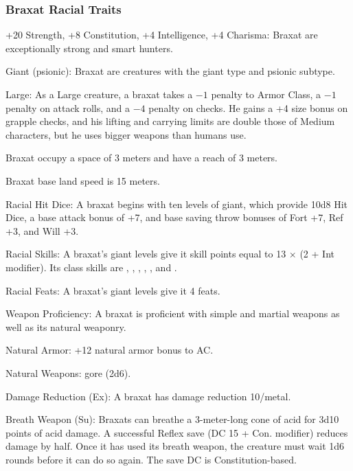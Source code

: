 \subsubsection{Braxat Racial Traits}
\begin{itemize*}
	\item +20 Strength, +8 Constitution, +4 Intelligence, +4 Charisma: Braxat are exceptionally strong and smart hunters.
    \item Giant (psionic): Braxat are creatures with the giant type and psionic subtype.
	\item Large: As a Large creature, a braxat takes a $-1$ penalty to Armor Class, a $-1$ penalty on attack rolls, and a $-4$ penalty on  checks. He gains a +4 size bonus on grapple checks, and his lifting and carrying limits are double those of Medium characters, but he uses bigger weapons than humans use.
    \item Braxat occupy a space of 3 meters and have a reach of 3 meters.
    \item Braxat base land speed is 15 meters.

    \item Racial Hit Dice: A braxat begins with ten levels of giant, which provide 10d8 Hit Dice, a base attack bonus of +7, and base saving throw bonuses of Fort +7, Ref +3, and Will +3.
    \item Racial Skills: A braxat's giant levels give it skill points equal to 13 $\times$ (2 + Int modifier). Its class skills are , , , , , and .
    \item Racial Feats: A braxat's giant levels give it 4 feats.
    \item Weapon Proficiency: A braxat is proficient with simple and martial weapons as well as its natural weaponry.

    \item Natural Armor: +12 natural armor bonus to AC.
    \item Natural Weapons: gore (2d6).

    \item Damage Reduction (Ex): A braxat has damage reduction 10/metal.
    \item Breath Weapon (Su): Braxats can breathe a 3-meter-long cone of acid for 3d10 points of acid damage. A successful Reflex save (DC 15 + Con. modifier) reduces damage by half. Once it has used its breath weapon, the creature must wait 1d6 rounds before it can do so again. The save DC is Constitution-based.


\end{itemize*}
